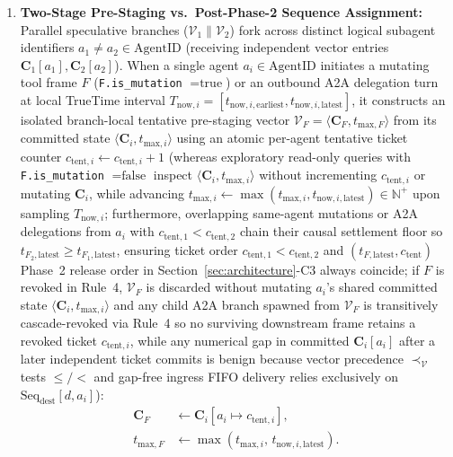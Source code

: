 \documentclass[conference,10pt]{IEEEtran}
\begin{document}
\begin{enumerate}
    \item \textbf{Two-Stage Pre-Staging vs.\ Post-Phase-2 Sequence Assignment:} Parallel speculative branches ($\mathcal{V}_1 \parallel \mathcal{V}_2$) fork across distinct logical subagent identifiers $a_1 \ne a_2 \in \text{AgentID}$ (receiving independent vector entries $\mathbf{C}_1[a_1], \mathbf{C}_2[a_2]$). When a single agent $a_i \in \text{AgentID}$ initiates a mutating tool frame $F$ (\texttt{F.is\_mutation} $= \text{true}$) or an outbound A2A delegation turn at local TrueTime interval $T_{\text{now},i} = [t_{\text{now},i,\text{earliest}}, t_{\text{now},i,\text{latest}}]$, it constructs an isolated branch-local tentative pre-staging vector $\mathcal{V}_F = \langle \mathbf{C}_F, t_{\text{max},F} \rangle$ from its committed state $\langle \mathbf{C}_i, t_{\text{max},i} \rangle$ using an atomic per-agent tentative ticket counter $c_{\text{tent},i} \leftarrow c_{\text{tent},i} + 1$ (whereas exploratory read-only queries with \texttt{F.is\_mutation} $= \text{false}$ inspect $\langle \mathbf{C}_i, t_{\text{max},i} \rangle$ without incrementing $c_{\text{tent},i}$ or mutating $\mathbf{C}_i$, while advancing $t_{\text{max},i} \leftarrow \max(t_{\text{max},i}, t_{\text{now},i,\text{latest}}) \in \mathbb{N}^+$ upon sampling $T_{\text{now},i}$; furthermore, overlapping same-agent mutations or A2A delegations from $a_i$ with $c_{\text{tent},1} < c_{\text{tent},2}$ chain their causal settlement floor so $t_{F_2,\text{latest}} \ge t_{F_1,\text{latest}}$, ensuring ticket order $c_{\text{tent},1} < c_{\text{tent},2}$ and $(t_{F,\text{latest}}, c_{\text{tent}})$ Phase~2 release order in Section~\ref{sec:architecture}-C3 always coincide; if $F$ is revoked in Rule~4, $\mathcal{V}_F$ is discarded without mutating $a_i$'s shared committed state $\langle \mathbf{C}_i, t_{\text{max},i} \rangle$ and any child A2A branch spawned from $\mathcal{V}_F$ is transitively cascade-revoked via Rule~4 so no surviving downstream frame retains a revoked ticket $c_{\text{tent},i}$, while any numerical gap in committed $\mathbf{C}_i[a_i]$ after a later independent ticket commits is benign because vector precedence $\prec_{\mathcal{V}}$ tests $\le / <$ and gap-free ingress FIFO delivery relies exclusively on $\text{Seq}_{\text{dest}}[d, a_i]$):
    \begin{equation}
    \begin{aligned}
    \mathbf{C}_F &\leftarrow \mathbf{C}_i[a_i \mapsto c_{\text{tent},i}], \\
    t_{\text{max},F} &\leftarrow \max(t_{\text{max},i},\, t_{\text{now},i,\text{latest}}).

\end{aligned}
\end{equation}
\end{enumerate}
\end{document}
